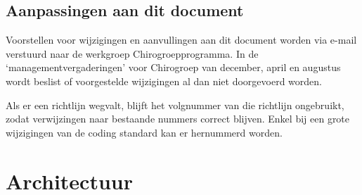 \documentclass[a4paper,11pt]{article}
\begin{document}
\subsection{Aanpassingen aan dit document}

Voorstellen voor wijzigingen en aanvullingen aan dit document worden via
e-mail verstuurd naar de werkgroep Chirogroepprogramma.  In de
`managementvergaderingen' voor Chirogroep van december, april en augustus
wordt beslist of voorgestelde wijzigingen al dan niet doorgevoerd worden.

Als er een richtlijn wegvalt, blijft het volgnummer van die richtlijn
ongebruikt, zodat verwijzingen naar bestaande nummers correct blijven.
Enkel bij een grote wijzigingen van de coding standard kan er
hernummerd worden.

\section{Architectuur}
\end{document}
